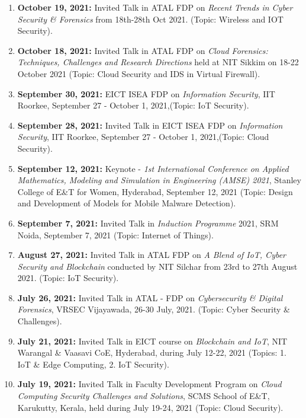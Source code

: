\begin{enumerate}
\item
\textbf{October 19, 2021:} Invited Talk in ATAL FDP on \textit{Recent Trends in Cyber Security \& Forensics} from 18th-28th Oct 2021. (Topic: Wireless and IOT Security).

\item
\textbf{October 18, 2021:} Invited Talk in ATAL FDP on \textit{Cloud Forensics: Techniques, Challenges and Research Directions} held at NIT Sikkim on 18-22 October 2021 (Topic: Cloud Security and IDS in Virtual Firewall).

\item
\textbf{September 30, 2021:} EICT ISEA FDP on \textit{Information Security}, IIT Roorkee, September 27 - October 1, 2021,(Topic: IoT Security).

\item
\textbf{September 28, 2021:} Invited Talk in EICT ISEA FDP on \textit{Information Security}, IIT Roorkee, September 27 - October 1, 2021,(Topic: Cloud Security).

\item
\textbf{September 12, 2021:} Keynote - \textit{1st International Conference on Applied Mathematics, Modeling and Simulation in Engineering (AMSE) 2021}, Stanley College of E\&T for Women, Hyderabad, September 12, 2021 (Topic: Design and Development of Models for Mobile Malware Detection).

\item
\textbf{September 7, 2021:} Invited Talk in \textit{Induction Programme} 2021, SRM Noida, September 7, 2021 (Topic: Internet of Things).

\item
\textbf{August 27, 2021:} Invited Talk in ATAL FDP on \textit{A Blend of IoT, Cyber Security and Blockchain} conducted by NIT Silchar from 23rd to 27th August 2021. (Topic: IoT Security).

\item
\textbf{July 26, 2021:} Invited Talk in ATAL - FDP on \textit{Cybersecurity \& Digital Forensics}, VRSEC Vijayawada, 26-30 July, 2021. (Topic: Cyber Security \& Challenges).

\item
\textbf{July 21, 2021:} Invited Talk in EICT course on \textit{Blockchain and IoT}, NIT Warangal \& Vaasavi CoE, Hyderabad, during July 12-22, 2021 (Topics: 1. IoT \& Edge Computing, 2. IoT Security).

\item
\textbf{July 19, 2021:} Invited Talk in Faculty Development Program on \textit{Cloud Computing Security Challenges and Solutions}, SCMS School of E\&T,  Karukutty, Kerala, held during July 19-24, 2021 (Topic: Cloud Security).


\end{enumerate}
